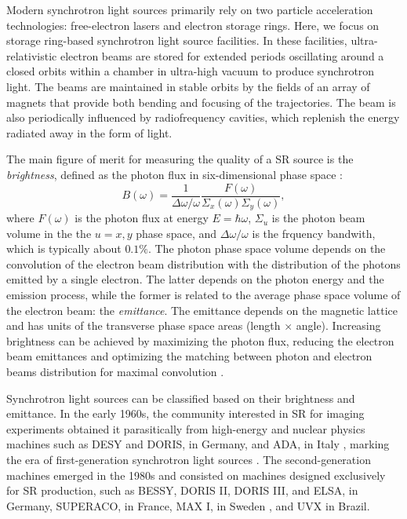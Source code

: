 Modern synchrotron light sources primarily rely on two particle acceleration technologies: free-electron lasers and electron storage rings. Here, we focus on storage ring-based synchrotron light source facilities. In these facilities, ultra-relativistic electron beams are stored for extended periods oscillating around a closed orbits within a chamber in ultra-high vacuum to produce synchrotron light. The beams are maintained in stable orbits by the fields of an array of magnets that provide both bending and focusing of the trajectories. The beam is also periodically influenced by radiofrequency cavities, which replenish the energy radiated away in the form of light.

The main figure of merit for measuring the quality of a SR source is the \textit{brightness}\cite{huang_brightness_2013}, defined as the photon flux in six-dimensional phase space \cite{hettel_challenges_2014}:
\begin{equation}
    B(\omega) = \frac{1}{\Delta \omega/\omega}\frac{F(\omega)}{\Sigma_{x}(\omega)\Sigma_{y}(\omega)},
\end{equation}
where $F(\omega)$ is the photon flux at energy $E=\hbar\omega$, $\Sigma_{u}$ is the photon beam volume in the the $u=x,y$ phase space, and $\Delta\omega/\omega$ is the frquency bandwith, which is typically about $0.1\%$. The photon phase space volume depends on the convolution of the electron beam distribution with the distribution of the photons emitted by a single electron. The latter depends on the photon energy and the emission process, while the former is related to the average phase space volume of the electron beam: the \textit{emittance}. The emittance depends on the magnetic lattice and has units of the transverse phase space areas (length $\times$ angle). Increasing brightness can be achieved by maximizing the photon flux, reducing the electron beam emittances and optimizing the matching between photon and electron beams distribution for maximal convolution \cite{wiedemann_particle_2015}.

Synchrotron light sources can be classified based on their brightness and emittance. In the early 1960s, the community interested in SR for imaging experiments obtained it parasitically from high-energy and nuclear physics machines such as DESY and DORIS, in Germany, and ADA, in Italy \cite{simoulin_synchrotron_2016}, marking the era of first-generation synchrotron light sources \cite{liu_towards_2017}. The second-generation machines emerged in the 1980s and consisted on machines designed exclusively for SR production, such as BESSY, DORIS II, DORIS III,  and ELSA, in Germany, SUPERACO, in France, MAX I, in Sweden \cite{simoulin_synchrotron_2016}, and UVX in Brazil.

